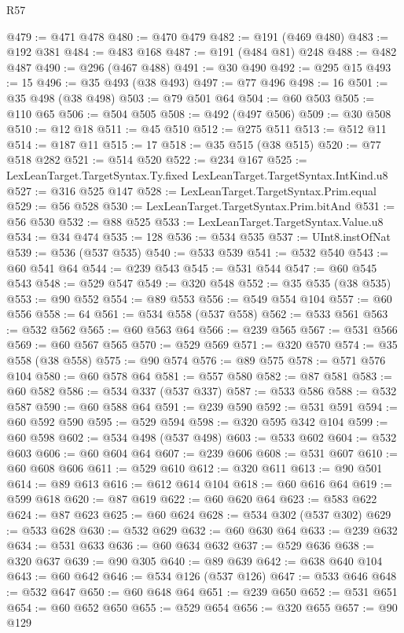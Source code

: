 \begin{lexlean}{R57}
\begin{coremodule}
@479 := @471 @478
@480 := @470 @479
@482 := @191 (@469 @480)
@483 := @192 @381
@484 := @483 @168
@487 := @191 (@484 @81) @248
@488 := @482 @487
@490 := @296 (@467 @488)
@491 := @30 @490
@492 := @295 @15
@493 := 15
@496 := @35 @493 (@38 @493)
@497 := @77 @496
@498 := 16
@501 := @35 @498 (@38 @498)
@503 := @79 @501 @64
@504 := @60 @503
@505 := @110 @65
@506 := @504 @505
@508 := @492 (@497 @506)
@509 := @30 @508
@510 := @12 @18
@511 := @45 @510
@512 := @275 @511
@513 := @512 @11
@514 := @187 @11
@515 := 17
@518 := @35 @515 (@38 @515)
@520 := @77 @518 @282
@521 := @514 @520
@522 := @234 @167
@525 := LexLeanTarget.TargetSyntax.Ty.fixed LexLeanTarget.TargetSyntax.IntKind.u8
@527 := @316 @525 @147
@528 := LexLeanTarget.TargetSyntax.Prim.equal
@529 := @56 @528
@530 := LexLeanTarget.TargetSyntax.Prim.bitAnd
@531 := @56 @530
@532 := @88 @525
@533 := LexLeanTarget.TargetSyntax.Value.u8
@534 := @34 @474
@535 := 128
@536 := @534 @535
@537 := UInt8.instOfNat
@539 := @536 (@537 @535)
@540 := @533 @539
@541 := @532 @540
@543 := @60 @541 @64
@544 := @239 @543
@545 := @531 @544
@547 := @60 @545 @543
@548 := @529 @547
@549 := @320 @548
@552 := @35 @535 (@38 @535)
@553 := @90 @552
@554 := @89 @553
@556 := @549 @554 @104
@557 := @60 @556
@558 := 64
@561 := @534 @558 (@537 @558)
@562 := @533 @561
@563 := @532 @562
@565 := @60 @563 @64
@566 := @239 @565
@567 := @531 @566
@569 := @60 @567 @565
@570 := @529 @569
@571 := @320 @570
@574 := @35 @558 (@38 @558)
@575 := @90 @574
@576 := @89 @575
@578 := @571 @576 @104
@580 := @60 @578 @64
@581 := @557 @580
@582 := @87 @581
@583 := @60 @582
@586 := @534 @337 (@537 @337)
@587 := @533 @586
@588 := @532 @587
@590 := @60 @588 @64
@591 := @239 @590
@592 := @531 @591
@594 := @60 @592 @590
@595 := @529 @594
@598 := @320 @595 @342 @104
@599 := @60 @598
@602 := @534 @498 (@537 @498)
@603 := @533 @602
@604 := @532 @603
@606 := @60 @604 @64
@607 := @239 @606
@608 := @531 @607
@610 := @60 @608 @606
@611 := @529 @610
@612 := @320 @611
@613 := @90 @501
@614 := @89 @613
@616 := @612 @614 @104
@618 := @60 @616 @64
@619 := @599 @618
@620 := @87 @619
@622 := @60 @620 @64
@623 := @583 @622
@624 := @87 @623
@625 := @60 @624
@628 := @534 @302 (@537 @302)
@629 := @533 @628
@630 := @532 @629
@632 := @60 @630 @64
@633 := @239 @632
@634 := @531 @633
@636 := @60 @634 @632
@637 := @529 @636
@638 := @320 @637
@639 := @90 @305
@640 := @89 @639
@642 := @638 @640 @104
@643 := @60 @642
@646 := @534 @126 (@537 @126)
@647 := @533 @646
@648 := @532 @647
@650 := @60 @648 @64
@651 := @239 @650
@652 := @531 @651
@654 := @60 @652 @650
@655 := @529 @654
@656 := @320 @655
@657 := @90 @129

\end{coremodule}
\end{lexlean}
